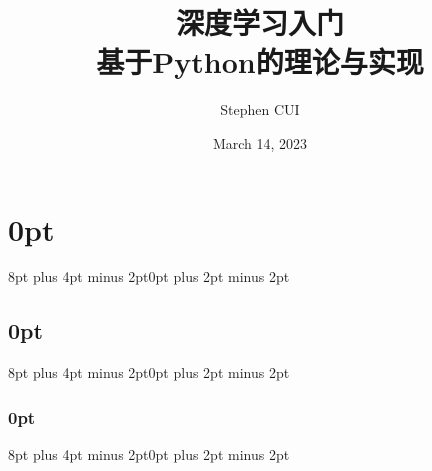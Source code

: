 \usepackage{amsmath, amssymb}
\usepackage{mathptmx}
\usepackage{siunitx}
\usepackage{ctex}
\usepackage{minted}
\usepackage{tcolorbox}
\usepackage{epigraph}
\usepackage{caption}
\usepackage{subcaption}
\usepackage{pdfpages}
\usepackage{graphicx}
\usepackage{listings}
\newtheorem{theorem}{Theorem}
\usepackage{tikz}
\usepackage{pifont}
\usepackage{tabularx}
\usepackage{framed}
\usepackage[lined,boxed,ruled]{algorithm2e}
\usepackage{titlesec}
\usepackage{bm}
\usepackage{appendix}

\titlespacing\section{0pt}{8pt plus 4pt minus 2pt}{0pt plus 2pt minus 2pt}
\titlespacing\subsection{0pt}{8pt plus 4pt minus 2pt}{0pt plus 2pt minus 2pt}
\titlespacing\subsubsection{0pt}{8pt plus 4pt minus 2pt}{0pt plus 2pt minus 2pt}

\makeatletter
\let\old@endpart\@endpart
\renewcommand\@endpart[1][]{%
    \begin{quote}#1\end{quote}%
    \old@endpart}
\makeatother


\title{\textbf{深度学习入门}\\基于Python的理论与实现}

\author{Stephen CUI}
\date{March 14, 2023}

\newcommand\tips[1]{\textcolor{green!70!black}{#1}}
\newcommand\notes[1]{\textcolor{blue!70}{#1}}
\newcommand\important[1]{\textcolor{red!90!black}{#1}}

\newcommand\figures[1]{
    \begin{figure}
        \centering
        \texttt{[image: Figures/\#1.png]}
        \caption{#1}
        \label{#1}
    \end{figure}
}

